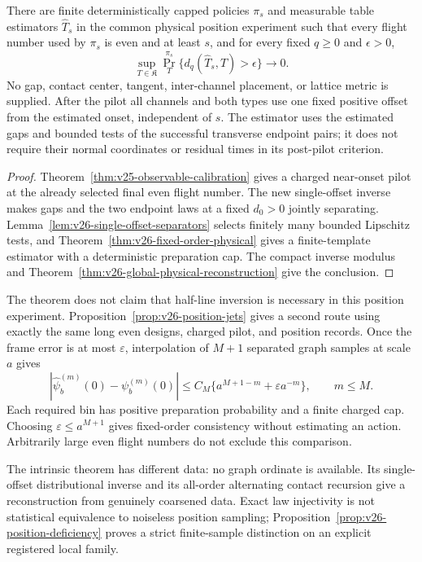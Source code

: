 \begin{theorem}
\label{thm:v26-intro-physical}
\label{thm:v25-intro-physical}
There are finite deterministically capped policies \(\pi_s\) and measurable
table estimators \(\widehat T_s\) in the common physical position experiment
such that every flight number used by \(\pi_s\) is even and at least
\(s\), and for every fixed \(q\ge0\) and \(\epsilon>0\),
\[
 \sup_{T\in\mathfrak K}\Pr_T^{\pi_s}
       \{d_q(\widehat T_s,T)>\epsilon\}\longrightarrow0.
\]
No gap, contact center, tangent, inter-channel placement, or lattice metric
is supplied.  After the pilot all channels and both types use one fixed
positive offset from the estimated onset, independent of \(s\).  The
estimator uses the estimated gaps and bounded tests of the successful
transverse endpoint pairs; it does not require their normal coordinates
or residual times in its post-pilot criterion.
\end{theorem}

\begin{proof}
Theorem~\ref{thm:v25-observable-calibration} gives a charged near-onset
pilot at the already selected final even flight number.  The new
single-offset inverse makes gaps and the two endpoint laws at a fixed
\(d_0>0\) jointly separating.  Lemma~\ref{lem:v26-single-offset-separators}
selects finitely many bounded Lipschitz tests, and
Theorem~\ref{thm:v26-fixed-order-physical} gives a finite-template estimator
with a deterministic preparation cap.  The compact inverse modulus and
Theorem~\ref{thm:v26-global-physical-reconstruction} give the conclusion.
\end{proof}

The theorem does not claim that half-line inversion is necessary in this
position experiment.  Proposition~\ref{prop:v26-position-jets} gives a
second route using exactly the same long even designs, charged pilot, and
position records.  Once the frame error is at most \(\varepsilon\),
interpolation of \(M+1\) separated graph samples at scale \(a\) gives
\[
 |\widehat\psi_b^{(m)}(0)-\psi_b^{(m)}(0)|
 \le C_M\{a^{M+1-m}+\varepsilon a^{-m}\},\qquad m\le M.
\]
Each required bin has positive preparation probability and a finite charged
cap.  Choosing \(\varepsilon\le a^{M+1}\) gives fixed-order consistency
without estimating an action.  Arbitrarily large even flight numbers do
not exclude this comparison.

The intrinsic theorem has different data: no graph ordinate is available.
Its single-offset distributional inverse and its all-order alternating
contact recursion give a reconstruction from genuinely coarsened data.
Exact law injectivity is not statistical equivalence to noiseless position
sampling; Proposition~\ref{prop:v26-position-deficiency} proves a strict
finite-sample distinction on an explicit registered local family.

